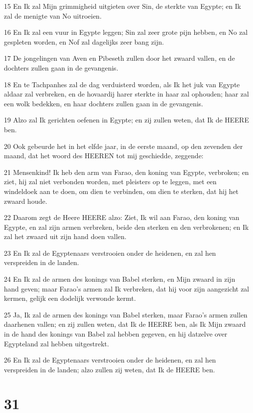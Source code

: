 \par 15 En Ik zal Mijn grimmigheid uitgieten over Sin, de sterkte van Egypte; en Ik zal de menigte van No uitroeien.
\par 16 En Ik zal een vuur in Egypte leggen; Sin zal zeer grote pijn hebben, en No zal gespleten worden, en Nof zal dagelijks zeer bang zijn.
\par 17 De jongelingen van Aven en Pibeseth zullen door het zwaard vallen, en de dochters zullen gaan in de gevangenis.
\par 18 En te Tachpanhes zal de dag verduisterd worden, als Ik het juk van Egypte aldaar zal verbreken, en de hovaardij harer sterkte in haar zal ophouden; haar zal een wolk bedekken, en haar dochters zullen gaan in de gevangenis.
\par 19 Alzo zal Ik gerichten oefenen in Egypte; en zij zullen weten, dat Ik de HEERE ben.
\par 20 Ook gebeurde het in het elfde jaar, in de eerste maand, op den zevenden der maand, dat het woord des HEEREN tot mij geschiedde, zeggende:
\par 21 Mensenkind! Ik heb den arm van Farao, den koning van Egypte, verbroken; en ziet, hij zal niet verbonden worden, met pleisters op te leggen, met een windeldoek aan te doen, om dien te verbinden, om dien te sterken, dat hij het zwaard houde.
\par 22 Daarom zegt de Heere HEERE alzo: Ziet, Ik wil aan Farao, den koning van Egypte, en zal zijn armen verbreken, beide den sterken en den verbrokenen; en Ik zal het zwaard uit zijn hand doen vallen.
\par 23 En Ik zal de Egyptenaars verstrooien onder de heidenen, en zal hen verspreiden in de landen.
\par 24 En Ik zal de armen des konings van Babel sterken, en Mijn zwaard in zijn hand geven; maar Farao's armen zal Ik verbreken, dat hij voor zijn aangezicht zal kermen, gelijk een dodelijk verwonde kermt.
\par 25 Ja, Ik zal de armen des konings van Babel sterken, maar Farao's armen zullen daarhenen vallen; en zij zullen weten, dat Ik de HEERE ben, als Ik Mijn zwaard in de hand des konings van Babel zal hebben gegeven, en hij datzelve over Egypteland zal hebben uitgestrekt.
\par 26 En Ik zal de Egyptenaars verstrooien onder de heidenen, en zal hen verspreiden in de landen; alzo zullen zij weten, dat Ik de HEERE ben.

\chapter{31}

